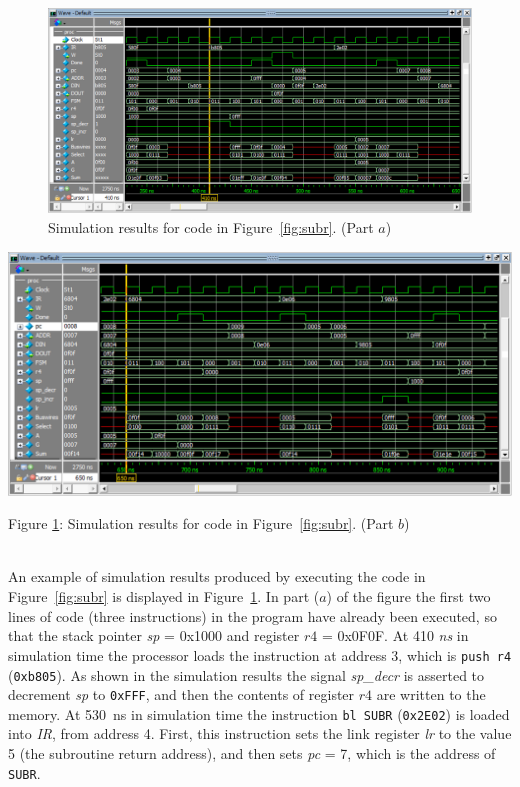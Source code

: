 \documentclass[epsfig,10pt,fullpage]{article} \addtolength{\textwidth}{1.5in}
\begin{document}
\begin{enumerate}
\begin{minipage}[H]{15.5 cm}
\begin{figure}[H]
    \begin{center}
        \includegraphics[width = .88\textwidth]{figures/push_bl.png}
    \end{center}
    \begin{center}
        \caption{Simulation results for code in Figure~\ref{fig:subr}. (Part $a$)}
        \label{fig:subr1}
    \end{center}
\end{figure}

\begin{center}
        \includegraphics[width = .88\textwidth]{figures/bl_pop.png}
\end{center}

\begin{center}
Figure \ref{fig:subr1}: Simulation results for code in Figure~\ref{fig:subr}. (Part $b$)
\end{center}
\end{minipage}

~\\
An example of simulation results produced by executing the code in Figure~\ref{fig:subr} is
displayed in Figure~\ref{fig:subr1}. In part ($a$) of the figure 
the first two lines of code (three instructions) in the program have already been executed,
so that the stack pointer {\it sp} = 0x1000 and 
register $r4$ = 0x0F0F. At 410 {\it ns} in simulation time the processor loads the
instruction at address 3, which is \texttt{push~r4} (\texttt{0xb805}). 
As shown in the simulation results
the signal {\it sp\_decr} is asserted to decrement {\it sp} to \texttt{0xFFF}, and then
the contents of register $r4$ are written to the memory. At 530~ns in simulation time
the instruction \texttt{bl~SUBR} (\texttt{0x2E02}) is loaded into {\it IR}, from address 4. 
First, this instruction sets the link register {\it lr} to the value 5 (the subroutine return 
address), and then sets {\it pc} = 7, which is the address of \texttt{SUBR}. 


\end{enumerate}
\end{document}
